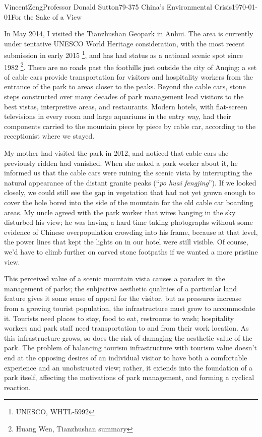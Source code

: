 \documentclass[12pt]{article}
\begin{document}
\begin{mla}{Vincent}{Zeng}{Professor Donald Sutton}{79-375 China's Environmental Crisis}{\today}{For the Sake of a View}

In May 2014, I visited the Tianzhushan Geopark in Anhui. The area is currently
under tentative UNESCO World Heritage consideration, with the most recent submission in
early 2015 \footnote{UNESCO, WHTL-5992}, and has had status
as a national scenic spot since 1982 \footnote{Huang Wen, Tianzhushan summary}.  There are no roads past the
foothills just outside the city of Anqing; a set of cable cars provide
transportation for visitors and hospitality workers from the entrance of the
park to areas closer to the peaks. Beyond the cable cars, stone steps
constructed over many decades of park management lead visitors to the best
vistas, interpretive areas, and restaurants. Modern hotels, with flat-screen
televisions in every room and large aquariums in the entry way, had their
components carried to the mountain piece by piece by cable car, according to
the receptionist where we stayed.

My mother had visited the park in 2012, and noticed that cable cars she
previously ridden had vanished. When she asked a park worker about it, he
informed us that the cable cars were ruining the scenic vista by interrupting the
natural appearance of the distant granite peaks (``\textit{po huai fengjing}''). If we looked closely, we
could still see the gap in vegetation that had not yet grown enough to cover
the hole bored into the side of the mountain for the old cable car boarding
areas. My uncle agreed with the park worker that wires hanging in the sky
disturbed his view; he was having a hard time taking photographs without some
evidence of Chinese overpopulation crowding into his frame, because at that level,
the power lines that kept the lights on in our hotel were still visible. Of course, we'd
have to climb further on carved stone footpaths if we wanted a more pristine
view.

This perceived value of a scenic mountain vista causes a paradox in the
management of parks; the subjective aesthetic qualities of a particular land
feature gives it some sense of appeal for the visitor, but as pressures
increase from a growing tourist population, the infrastructure must grow to accommodate it.
Tourists need places to stay, food to eat, restrooms to wash; hospitality workers and
park staff need transportation to and from their work location. As this infrastructure
grows, so does the risk of damaging the aesthetic value of the park. The problem
of balancing tourism infrastructure with tourism value doesn't end at the
opposing desires of an individual visitor to have both a comfortable
experience and an unobstructed view; rather, it extends into the foundation
of a park itself, affecting the motivations of park management, and forming a cyclical reaction.


\end{mla}
\end{document}
